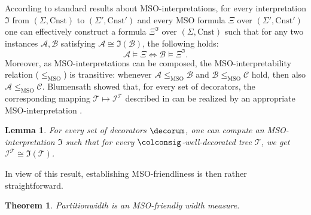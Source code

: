 \documentclass[10pt,a4paper]{amsart}
\theoremstyle{definition}
\numberwithin{equation}{section}
\theoremstyle{plain}
\newtheorem{theorem}[theorem]{Theorem}
\newtheorem{lemma}[lemma]{Lemma}
\newtheorem{observation}[observation]{Observation}
\theoremstyle{definition}
\newcommand{\remarkstart}{\color{black}}
\theoremstyle{myexample}
\theoremstyle{plain}
\theoremstyle{definition}
\newcommand{\instance}{\mathcal{I}}
\newcommand{\inst}{\instance}
\newcommand{\Ercwidth}{\Partitionwidth}
\newcommand{\Partitionwidth}{Par\-ti\-tion\-width}
\newcommand{\pred}[1]{\mathtt{#1}}
\newcommand{\const}[1]{\mathtt{#1}}
\newcommand{\rpred}{\pred{R}}
\renewcommand{\phi}{\varphi}
\begin{document}
According to standard results about MSO-interpretations, for every interpretation $\mathfrak{I}$ from $(\Sigma, \mathrm{Cnst})$ to $(\Sigma', \mathrm{Cnst}')$ and every MSO formula $\Xi$ over $(\Sigma', \mathrm{Cnst}')$ one can effectively construct a formula $\Xi^{\mathfrak{I}}$ over $(\Sigma, \mathrm{Cnst})$ such that for any two instances $\mathcal{A}, \mathcal{B}$ satisfying 
$\mathcal{A} \cong \mathfrak{I}(\mathcal{B})$,
the following holds:
$$\mathcal{A} \models \Xi \iff \mathcal{B} \models \Xi^{\mathfrak{I}}.$$%
%
%
Moreover, as MSO-interpretations can be composed, the MSO-interpretability relation ($\leq_{\text{MSO}}$) is transitive:
whenever $\mathcal{A} \leq_{\text{MSO}} \mathcal{B}$ and $\mathcal{B} \leq_{\text{MSO}} \mathcal{C}$ hold, then also $\mathcal{A} \leq_{\text{MSO}} \mathcal{C}$.
Blumensath showed that, for every set of decorators, the corresponding mapping $\mathcal{T} \mapsto \inst^{\mathcal{T}}$ described in 
can be realized by an appropriate MSO-interpretation \cite[Prop. 17]{Blumensath06}.
%
\begin{lemma}\label{lem:computable-mso-tree-interpretations}
For every set of decorators $\decorum$, one can compute an MSO-interpretation $\mathfrak{I}$ such that for every $\colconsig$-well-decorated tree $\mathcal{T}$, we get $\inst^{\mathcal{T}} \cong \mathfrak{I}(\mathcal{T})$.
\end{lemma}
%
\remarkstart
In view of this result, establishing MSO-friendliness is then rather straightforward.
\color{black}
%
\begin{theorem}\label{thm:cliquewidth-k-MSO-decidable}
	\Ercwidth{} is an MSO-friendly width measure.
\end{theorem}
\end{document}
